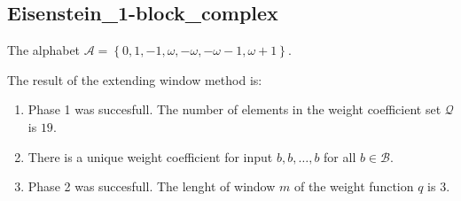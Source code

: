 \subsection{ Eisenstein\_1-block\_complex }

\label{subsec:Eisenstein1-blockcomplex}

The alphabet $\mathcal{A} =\left\{0, 1, -1, \omega, -\omega, -\omega - 1, \omega + 1\right\}$.

\noindent The result of the extending window method is:
\begin{enumerate}
    \item Phase 1 was succesfull.
The number of elements in the weight coefficient set $\mathcal{Q}$ is $19$.

    \item There is a unique weight coefficient for input $b,b,\dots,b$ for all $b\in\mathcal{B}$.

    \item Phase 2 was succesfull.
The lenght of window $m$ of the weight function $q$ is 3.
\end{enumerate}
